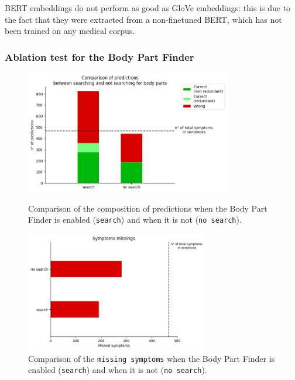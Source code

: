 BERT embeddings do not perform as good as GloVe embeddings: this is due to the fact that they were extracted from a non-finetuned BERT, which has not been trained on any medical corpus.


\subsubsection{Ablation test for the Body Part Finder}

\begin{figure}[h]%
  \centering
  \begin{minipage}[b]{0.4\textwidth}
    \includegraphics[width=9cm]{graphs/comparison_search_bp}
    \caption{Comparison of the composition of predictions when the Body Part Finder is enabled (\texttt{search}) and when it is not (\texttt{no search}).}
  \end{minipage}
  \hfill
  \begin{minipage}[b]{0.4\textwidth}
    \includegraphics[width=8cm]{graphs/comparison_search_bp_missings}
    \caption{Comparison of the \texttt{missing symptoms} when the Body Part Finder is enabled (\texttt{search}) and when it is not (\texttt{no search}).}
  \end{minipage}
\end{figure}

